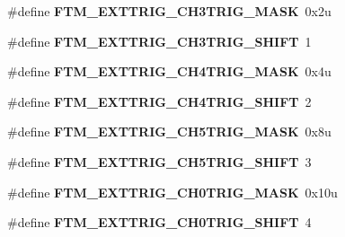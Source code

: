 \begin{DoxyCompactItemize}
\item 
\#define {\bfseries F\+T\+M\+\_\+\+E\+X\+T\+T\+R\+I\+G\+\_\+\+C\+H3\+T\+R\+I\+G\+\_\+\+M\+A\+SK}~0x2u\hypertarget{group__FTM__Register__Masks_gaeec1aec17cdbd9a74b521b085dee6bf2}{}\label{group__FTM__Register__Masks_gaeec1aec17cdbd9a74b521b085dee6bf2}

\item 
\#define {\bfseries F\+T\+M\+\_\+\+E\+X\+T\+T\+R\+I\+G\+\_\+\+C\+H3\+T\+R\+I\+G\+\_\+\+S\+H\+I\+FT}~1\hypertarget{group__FTM__Register__Masks_ga9e1c577c8cb405f8e8b518445ca1139a}{}\label{group__FTM__Register__Masks_ga9e1c577c8cb405f8e8b518445ca1139a}

\item 
\#define {\bfseries F\+T\+M\+\_\+\+E\+X\+T\+T\+R\+I\+G\+\_\+\+C\+H4\+T\+R\+I\+G\+\_\+\+M\+A\+SK}~0x4u\hypertarget{group__FTM__Register__Masks_gaf8bedf8c8979cb1fa16cb9b35c7a4399}{}\label{group__FTM__Register__Masks_gaf8bedf8c8979cb1fa16cb9b35c7a4399}

\item 
\#define {\bfseries F\+T\+M\+\_\+\+E\+X\+T\+T\+R\+I\+G\+\_\+\+C\+H4\+T\+R\+I\+G\+\_\+\+S\+H\+I\+FT}~2\hypertarget{group__FTM__Register__Masks_ga314862acbbedef36aca6aaccd9b1ff74}{}\label{group__FTM__Register__Masks_ga314862acbbedef36aca6aaccd9b1ff74}

\item 
\#define {\bfseries F\+T\+M\+\_\+\+E\+X\+T\+T\+R\+I\+G\+\_\+\+C\+H5\+T\+R\+I\+G\+\_\+\+M\+A\+SK}~0x8u\hypertarget{group__FTM__Register__Masks_ga26b412d681cbb61d30d2e9d25c906b66}{}\label{group__FTM__Register__Masks_ga26b412d681cbb61d30d2e9d25c906b66}

\item 
\#define {\bfseries F\+T\+M\+\_\+\+E\+X\+T\+T\+R\+I\+G\+\_\+\+C\+H5\+T\+R\+I\+G\+\_\+\+S\+H\+I\+FT}~3\hypertarget{group__FTM__Register__Masks_gadb3658c9b3090cf71c98a986137a0295}{}\label{group__FTM__Register__Masks_gadb3658c9b3090cf71c98a986137a0295}

\item 
\#define {\bfseries F\+T\+M\+\_\+\+E\+X\+T\+T\+R\+I\+G\+\_\+\+C\+H0\+T\+R\+I\+G\+\_\+\+M\+A\+SK}~0x10u\hypertarget{group__FTM__Register__Masks_ga8c677fe12d48d6f0c1b336df2aaff174}{}\label{group__FTM__Register__Masks_ga8c677fe12d48d6f0c1b336df2aaff174}

\item 
\#define {\bfseries F\+T\+M\+\_\+\+E\+X\+T\+T\+R\+I\+G\+\_\+\+C\+H0\+T\+R\+I\+G\+\_\+\+S\+H\+I\+FT}~4\hypertarget{group__FTM__Register__Masks_ga2c365c7c86ae305f243cd065d9bb9202}{}\label{group__FTM__Register__Masks_ga2c365c7c86ae305f243cd065d9bb9202}


\end{DoxyCompactItemize}
